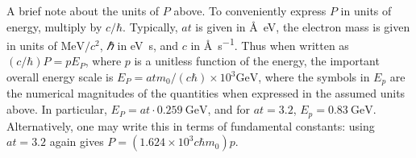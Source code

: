 A brief note about the units of $P$ above.
To conveniently express $P$ in units of energy,
multiply by $c / \si{\planckbar}$.
Typically, $a t$ is given in \si{\angstrom\electronvolt},
the electron mass is given in units
of $\si{\mega \electronvolt} / c^2$,
\si{\planckbar} in \si{\electronvolt\second},
and $c$ in \si{\angstrom\per\second}.
Thus when written as $(c / ℏ) P = p E_P$,
where $p$ is a unitless function of the energy,
the important overall energy scale is
$E_P = at m_0 / (c ℏ) × 10^3 \si{\giga\electronvolt}$,
where the symbols in $E_p$ are the numerical magnitudes of the
quantities when expressed in the assumed units above.
In particular,
$E_P = at · \SI{0.259}{\giga\electronvolt}$,
and for $at = 3.2$, $E_p = \SI{0.83}{\giga\electronvolt}$.
Alternatively, one may write this in terms of fundamental constants:
using $at = 3.2$ again gives
$P = \left( 1.624 × 10^3 c ℏ m_0 \right) p$.
